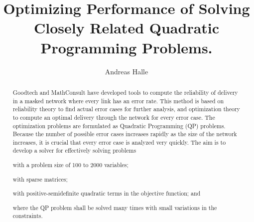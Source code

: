 \documentclass[a4paper,12pt]{report}
\begin{document}
\newcommand*\printpoint[2]{(%
\pgfmathparse{0.03514598035*#1}\pgfmathprintnumber{\pgfmathresult},%
\pgfmathparse{0.03514598035*#2}\pgfmathprintnumber{\pgfmathresult})%
}

\title{Optimizing Performance of Solving Closely Related Quadratic Programming
       Problems.}

\author{Andreas Halle}
\maketitle
\thispagestyle{empty}
\newpage

\thispagestyle{empty}
\begin{abstract}
Goodtech and MathConsult have developed tools to compute the reliability of
delivery in a masked network where every link has an error rate.
This method is based on reliability theory to find actual error cases for
further analysis, and optimization theory to compute an optimal delivery
through the network for every error case.
The optimization problems are formulated as Quadratic Programming (QP)
problems.
Because the number of possible error cases increases rapidly as the size of the
network increases, it is crucial that every error case is analyzed very
quickly.
The aim is to develop a solver for effectively solving problems
\begin{inparaenum}
  \item with a problem size of 100 to 2000 variables;
  \item with sparse matrices;
  \item with positive-semidefinite quadratic terms in the objective function;
        and
  \item where the QP problem shall be solved many times with small variations
        in the constraints.
\end{inparaenum}
\end{abstract}
\newpage

\setcounter{page}{3}
\tableofcontents
\newpage
\end{document}
